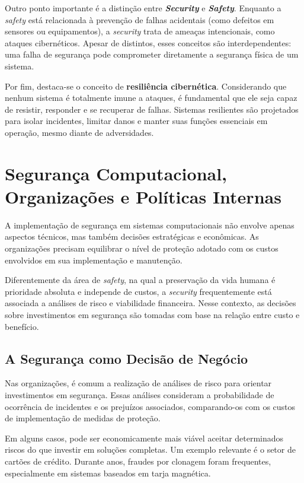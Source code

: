 \documentclass[12pt,a4paper,twoside]{report}
\begin{document}
Outro ponto importante é a distinção entre \textbf{\textit{Security}} e \textbf{\textit{Safety}}. Enquanto a \textit{safety} está relacionada à prevenção de falhas acidentais (como defeitos em sensores ou equipamentos), a \textit{security} trata de ameaças intencionais, como ataques cibernéticos. Apesar de distintos, esses conceitos são interdependentes: uma falha de segurança pode comprometer diretamente a segurança física de um sistema.

Por fim, destaca-se o conceito de \textbf{resiliência cibernética}. Considerando que nenhum sistema é totalmente imune a ataques, é fundamental que ele seja capaz de resistir, responder e se recuperar de falhas. Sistemas resilientes são projetados para isolar incidentes, limitar danos e manter suas funções essenciais em operação, mesmo diante de adversidades.

\section{Segurança Computacional, Organizações e Políticas Internas}

A implementação de segurança em sistemas computacionais não envolve apenas aspectos técnicos, mas também decisões estratégicas e econômicas. As organizações precisam equilibrar o nível de proteção adotado com os custos envolvidos em sua implementação e manutenção.

Diferentemente da área de \textit{safety}, na qual a preservação da vida humana é prioridade absoluta e independe de custos, a \textit{security} frequentemente está associada a análises de risco e viabilidade financeira. Nesse contexto, as decisões sobre investimentos em segurança são tomadas com base na relação entre custo e benefício.

\subsection{A Segurança como Decisão de Negócio}

Nas organizações, é comum a realização de análises de risco para orientar investimentos em segurança. Essas análises consideram a probabilidade de ocorrência de incidentes e os prejuízos associados, comparando-os com os custos de implementação de medidas de proteção.

Em alguns casos, pode ser economicamente mais viável aceitar determinados riscos do que investir em soluções completas. Um exemplo relevante é o setor de cartões de crédito. Durante anos, fraudes por clonagem foram frequentes, especialmente em sistemas baseados em tarja magnética.
\end{document}

